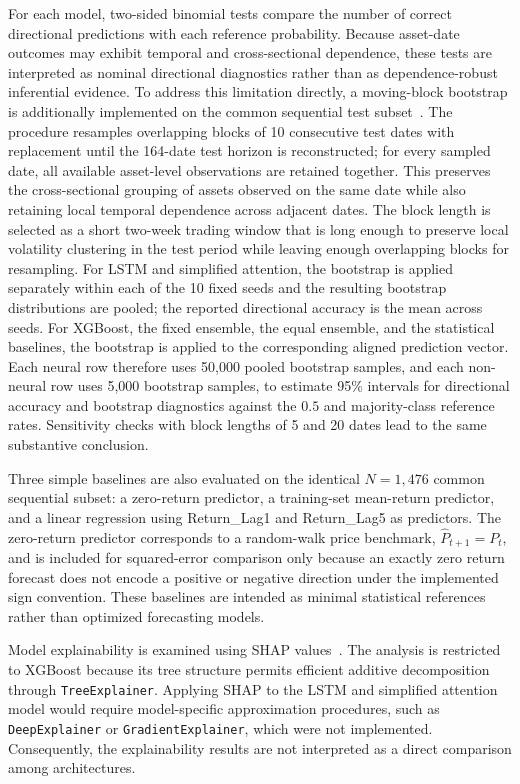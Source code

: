 \documentclass[utf8]{FrontiersinHarvard} %
\newcommand{\rev}[1]{{\color{red}#1}}
\begin{document}
For each model, two-sided binomial tests compare the number of correct directional predictions with each reference probability. Because asset-date outcomes may exhibit temporal and cross-sectional dependence, these tests are interpreted as nominal directional diagnostics rather than as dependence-robust inferential evidence. \rev{To address this limitation directly, a moving-block bootstrap is additionally implemented on the common sequential test subset~\citep{Kunsch1989}. The procedure resamples overlapping blocks of 10 consecutive test dates with replacement until the 164-date test horizon is reconstructed; for every sampled date, all available asset-level observations are retained together. This preserves the cross-sectional grouping of assets observed on the same date while also retaining local temporal dependence across adjacent dates. The block length is selected as a short two-week trading window that is long enough to preserve local volatility clustering in the test period while leaving enough overlapping blocks for resampling. For LSTM and simplified attention, the bootstrap is applied separately within each of the 10 fixed seeds and the resulting bootstrap distributions are pooled; the reported directional accuracy is the mean across seeds. For XGBoost, the fixed ensemble, the equal ensemble, and the statistical baselines, the bootstrap is applied to the corresponding aligned prediction vector. Each neural row therefore uses 50,000 pooled bootstrap samples, and each non-neural row uses 5,000 bootstrap samples, to estimate 95\% intervals for directional accuracy and bootstrap diagnostics against the \(0.5\) and majority-class reference rates. Sensitivity checks with block lengths of 5 and 20 dates lead to the same substantive conclusion.}

\rev{Three simple baselines are also evaluated on the identical \(N=1{,}476\) common sequential subset: a zero-return predictor, a training-set mean-return predictor, and a linear regression using Return\_Lag1 and Return\_Lag5 as predictors. The zero-return predictor corresponds to a random-walk price benchmark, \(\hat{P}_{t+1}=P_t\), and is included for squared-error comparison only because an exactly zero return forecast does not encode a positive or negative direction under the implemented sign convention. These baselines are intended as minimal statistical references rather than optimized forecasting models.}

Model explainability is examined using SHAP values~\citep{Lundberg2017shap}. The analysis is restricted to XGBoost because its tree structure permits efficient additive decomposition through \texttt{TreeExplainer}. Applying SHAP to the LSTM and simplified attention model would require model-specific approximation procedures, such as \texttt{DeepExplainer} or \texttt{GradientExplainer}, which were not implemented. Consequently, the explainability results are not interpreted as a direct comparison among architectures.
\end{document}
